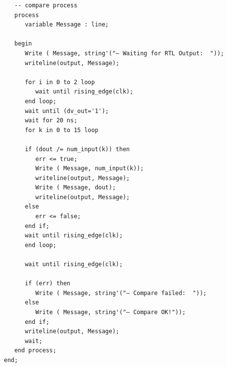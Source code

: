 \begin{Code}
\begin{lstlisting}
   -- compare process
   process
      variable Message : line;   
      
   begin
      Write ( Message, string'("— Waiting for RTL Output:  "));
      writeline(output, Message);   

      for i in 0 to 2 loop
         wait until rising_edge(clk); 
      end loop;  
      wait until (dv_out='1');  
      wait for 20 ns;
      for k in 0 to 15 loop
            
      if (dout /= num_input(k)) then
         err <= true; 
         Write ( Message, num_input(k));
         writeline(output, Message);
         Write ( Message, dout);
         writeline(output, Message);
      else 
         err <= false;
      end if;
      wait until rising_edge(clk); 
      end loop;

      wait until rising_edge(clk); 

      if (err) then
         Write ( Message, string'("— Compare failed:  "));
      else 
         Write ( Message, string'("— Compare OK!"));
      end if;
      writeline(output, Message);
      wait;
   end process;
end;
\end{lstlisting}
\end{Code}
